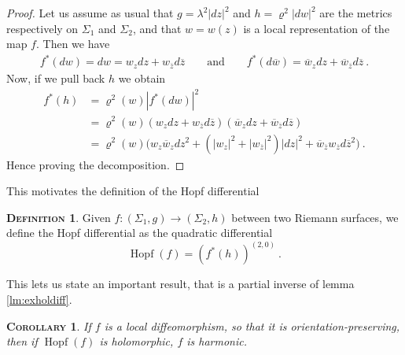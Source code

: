 \documentclass[a4paper,11pt,openright,twoside]{book}
\renewcommand{\rho}{\varrho}
\newcommand{\Hopf}{\operatorname{Hopf}}
\newcommand{\1}{\mathds{1}}
\theoremstyle{plain}
\newtheorem{cor}[thm]{\textsc{Corollary}}
\theoremstyle{definition}
\newtheorem{defn}[thm]{\textsc{Definition}}
\theoremstyle{remark}
\begin{document}
\begin{proof}
	Let us assume as usual that $g=\lambda^2|dz|^2$ and $h=\rho^2|dw|^2$ are the metrics respectively on $\Sigma_1$ and $\Sigma_2$, and that $w=w(z)$ is a local representation of the map $f$. Then we have
	\begin{align*}
		f^*(dw) = dw = w_z dz + w_{\overline{z}}d\overline{z}\qquad\text{and}\qquad f^*(d\overline{w})=\overline{w}_zdz+\overline{w}_{\overline{z}}d\overline{z}
	\ . 
	\end{align*}
	Now, if we pull back $h$ we obtain
	\begin{align*}
		f^*(h) &= \rho^2(w)|f^*(dw)|^2  \\
		&=  \rho^2(w)(w_zdz+w_{\overline{z}}d\overline{z})(\overline{w}_zdz+\overline{w}_{\overline{z}}d\overline{z}) \\
		&= \rho^2(w)\big(w_z\overline{w}_zdz^2 +(|w_z|^2+|w_{\overline{z}}|^2) |dz|^2+ \overline{w}_{\overline{z}}w_{\overline{z}}d\overline{z}^2\big)
	\ . 
	\end{align*}
	Hence proving the decomposition.
\end{proof}
This motivates the definition of the Hopf differential
\begin{defn}
	Given $f:(\Sigma_1,g) \to  (\Sigma_2,h) $ between two Riemann surfaces, we define the Hopf differential as the quadratic differential
	\[\Hopf(f) = (f^*(h))^{(2,0)}\ .\] 
\end{defn}
This lets us state an important result, that is a partial inverse of lemma \ref{lm:exholdiff}.
\begin{cor}\label{cor:diffeopresthenharm}
	If $f$ is a local diffeomorphism, so that it is orientation-preserving, then if $\Hopf(f)$ is holomorphic, $f$ is harmonic.
\end{cor}
\end{document}
